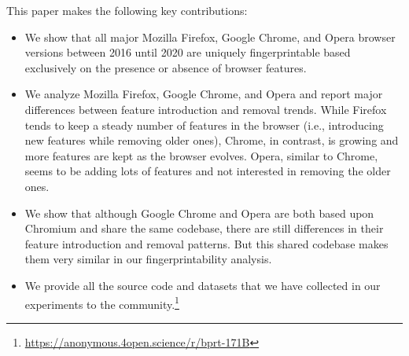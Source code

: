 \noindent This paper makes the following key contributions:
%
\begin{itemize}%

\item We show that all major Mozilla Firefox, Google Chrome, and Opera browser
  versions between 2016 until 2020 are uniquely fingerprintable based exclusively on the presence or absence of browser features.

\item We analyze Mozilla Firefox, Google Chrome, and Opera and report
  major differences between feature introduction and removal
  trends. While Firefox tends to keep a steady number of features in
  the browser (i.e., introducing new features while removing older
  ones), Chrome, in contrast, is growing and more features are kept as
  the browser evolves. Opera, similar to Chrome, seems to be adding lots
  of features and not interested in removing the older ones.

\item We show that although Google Chrome and Opera are both based upon
  Chromium and share the same codebase, there are still differences in their
  feature introduction and removal patterns. But this shared codebase makes them
  very similar in our fingerprintability analysis.


\item We provide all the source code and datasets that we have collected in our experiments to the community.\footnote{\url{https://anonymous.4open.science/r/bprt-171B}}

\end{itemize}

